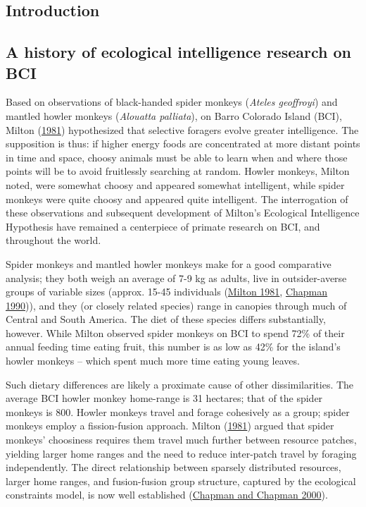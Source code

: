 \documentclass[twoside,12pt,final]{ucthesis-CA2012}
\begin{document}
\begin{ucmainmatter}
\hypertarget{introduction-3}{%
\section{Introduction}\label{introduction-3}}

\hypertarget{a-history-of-ecological-intelligence-research-on-bci}{%
\subsection{A history of ecological intelligence research on BCI}\label{a-history-of-ecological-intelligence-research-on-bci}}

Based on observations of black-handed spider monkeys (\emph{Ateles geoffroyi}) and mantled howler monkeys (\emph{Alouatta palliata}), on Barro Colorado Island (BCI), Milton (\protect\hyperlink{ref-milton1981}{1981}) hypothesized that selective foragers evolve greater intelligence. The supposition is thus: if higher energy foods are concentrated at more distant points in time and space, choosy animals must be able to learn when and where those points will be to avoid fruitlessly searching at random. Howler monkeys, Milton noted, were somewhat choosy and appeared somewhat intelligent, while spider monkeys were quite choosy and appeared quite intelligent. The interrogation of these observations and subsequent development of Milton's Ecological Intelligence Hypothesis have remained a centerpiece of primate research on BCI, and throughout the world.

Spider monkeys and mantled howler monkeys make for a good comparative analysis; they both weigh an average of 7-9 kg as adults, live in outsider-averse groups of variable sizes (approx. 15-45 individuals (\protect\hyperlink{ref-milton1981}{Milton 1981}, \protect\hyperlink{ref-chapman1990}{Chapman 1990})), and they (or closely related species) range in canopies through much of Central and South America. The diet of these species differs substantially, however. While Milton observed spider monkeys on BCI to spend 72\% of their annual feeding time eating fruit, this number is as low as 42\% for the island's howler monkeys -- which spent much more time eating young leaves.

Such dietary differences are likely a proximate cause of other dissimilarities. The average BCI howler monkey home-range is 31 hectares; that of the spider monkeys is 800. Howler monkeys travel and forage cohesively as a group; spider monkeys employ a fission-fusion approach. Milton (\protect\hyperlink{ref-milton1981}{1981}) argued that spider monkeys' choosiness requires them travel much further between resource patches, yielding larger home ranges and the need to reduce inter-patch travel by foraging independently. The direct relationship between sparsely distributed resources, larger home ranges, and fusion-fusion group structure, captured by the ecological constraints model, is now well established (\protect\hyperlink{ref-chapman2000}{Chapman and Chapman 2000}).


\end{ucmainmatter}
\end{document}
